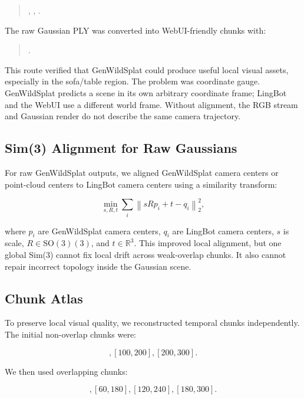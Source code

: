 \documentclass[11pt]{article}
\newcommand{\SO}{\mathrm{SO}(3)}
\newcommand{\R}{\mathbb{R}}
\begin{document}
\begin{quote}
, , .
\end{quote}

The raw Gaussian PLY was converted into WebUI-friendly chunks with:

\begin{quote}
.
\end{quote}

This route verified that GenWildSplat could produce useful local visual assets, especially in the sofa/table region. The problem was coordinate gauge. GenWildSplat predicts a scene in its own arbitrary coordinate frame; LingBot and the WebUI use a different world frame. Without alignment, the RGB stream and Gaussian render do not describe the same camera trajectory.

\subsection{Sim(3) Alignment for Raw Gaussians}

For raw GenWildSplat outputs, we aligned GenWildSplat camera centers or point-cloud centers to LingBot camera centers using a similarity transform:

\begin{equation}
\min_{s,R,t}\sum_i \left\|sRp_i + t - q_i\right\|_2^2,
\end{equation}

where \(p_i\) are GenWildSplat camera centers, \(q_i\) are LingBot camera centers, \(s\) is scale, \(R\in\SO(3)\), and \(t\in\R^3\). This improved local alignment, but one global Sim(3) cannot fix local drift across weak-overlap chunks. It also cannot repair incorrect topology inside the Gaussian scene.

\subsection{Chunk Atlas}

To preserve local visual quality, we reconstructed temporal chunks independently. The initial non-overlap chunks were:

\begin{equation}
[0,100], [100,200], [200,300].
\end{equation}

We then used overlapping chunks:

\begin{equation}
[0,120], [60,180], [120,240], [180,300].
\end{equation}
\end{document}
